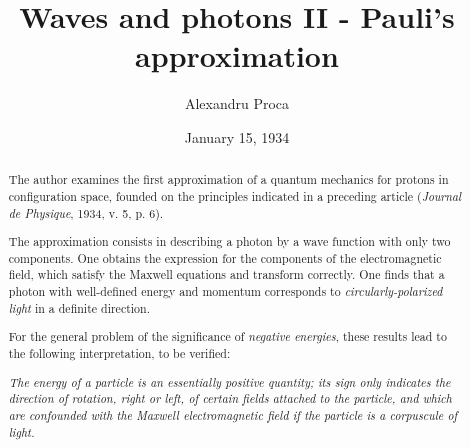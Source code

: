 \documentclass{article}
\author{Alexandru Proca}
\date{January 15, 1934}
\title{Waves and photons II - Pauli's approximation}
\renewcommand{\it}[1]{\textit{#1}}
\begin{document}
\maketitle

\begin{abstract}
The author examines the first approximation of a quantum mechanics for protons in configuration space, founded on the principles indicated in a preceding article (\it{Journal de Physique}, 1934, v. 5, p. 6).

The approximation consists in describing a photon by a wave function with only two components. One obtains the expression for the components of the electromagnetic field, which satisfy the Maxwell equations and transform correctly. One finds that a photon with well-defined energy and momentum corresponds to \it{circularly-polarized light} in a definite direction.

For the general problem of the significance of \it{negative energies}, these results lead to the following interpretation, to be verified:

\it{The energy of a particle is an essentially positive quantity; its sign only indicates the direction of rotation, right or left, of certain fields attached to the particle, and which are confounded with the Maxwell electromagnetic field if the particle is a corpuscule of light.}
\end{abstract}
\end{document}
